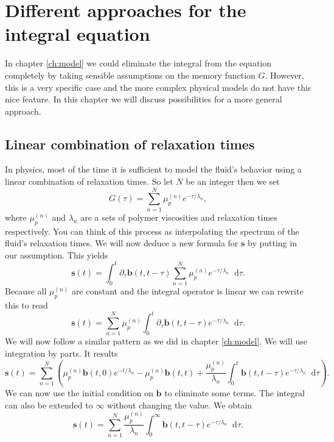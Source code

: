 \documentclass[12pt,a4paper,twoside, open=right]{scrreprt}
\theoremstyle{definition}
\theoremstyle{plain}
\newcommand{\bfb}{\bm{b}}
\newcommand{\bfs}{\bm{s}}
\newcommand{\D}{\mathop{}\!\mathrm{d}}
\begin{document}
\chapter{Different approaches for the integral equation}
In chapter \ref{ch:model} we could eliminate the integral from the equation completely by taking sensible assumptions on the memory function $G$. However, this is a very specific case and the more complex physical models do not have this nice feature. In this chapter we will discuss possibilities for a more general approach. 
\section{Linear combination of relaxation times}
In physics, most of the time it is sufficient to model the fluid's behavior using a linear combination of relaxation times. So let $N$ be an integer then we set
\begin{equation}
    G(\tau)=\sum_{n=1}^{N}\mu_p^{(n)}e^{-\tau/\lambda_n},
\end{equation}
where $\mu_p^{(n)}$ and $\lambda_n$ are a sets of polymer viscosities and relaxation times respectively. You can think of this process as interpolating the spectrum of the fluid's relaxation times. We will now deduce a new formula for $\bfs$ by putting in our assumption. This yields
\begin{equation}
    \bfs(t)=\int_0^t\partial_\tau \bfb(t,t-\tau)\sum_{n=1}^{N}\mu_p^{(n)}e^{-\tau/\lambda_n}\D\tau.
\end{equation}
Because all $\mu_p^{(n)}$ are constant and the integral operator is linear we can rewrite this to read
\begin{equation}
    \bfs(t) = \sum_{n=1}^{N}\mu_p^{(n)}\int_0^t\partial_\tau \bfb(t,t-\tau)e^{-\tau/\lambda_n}\D\tau.
\end{equation}
We will now follow a similar pattern as we did in chapter \ref{ch:model}. We will use integration by parts. It results
\begin{equation}
    \bfs(t)=\sum_{n=1}^{N}\left(\mu_p^{(n)}\bfb(t,0)e^{-t/\lambda_n}-\mu_p^{(n)}\bfb(t,t)+\frac{\mu_p^{(n)}}{\lambda_n}\int_0^t\bfb(t,t-\tau)e^{-\tau/\lambda_n}\D\tau \right).
\end{equation}
We can now use the initial condition on $\bfb$ to eliminate some terms. The integral can also be extended to $\infty$ without changing the value. We obtain
\begin{equation}
    \bfs(t)=\sum_{n=1}^N\frac{\mu_p^{(n)}}{\lambda_n}\int_0^\infty\bfb(t,t-\tau)e^{-\tau/\lambda_n}\D\tau.
\end{equation}
\end{document}
